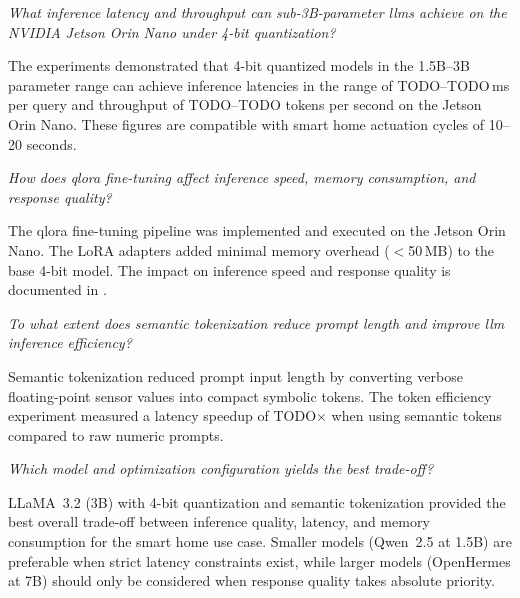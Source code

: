 \documentclass[12pt,a4paper,oneside]{report}
\begin{document}
\begin{description}[style=nextline,leftmargin=1.2cm]
    \item[\textbf{RQ1.}] \textit{What inference latency and throughput can sub-3B-parameter \glspl{llm} achieve on the NVIDIA Jetson Orin Nano under 4-bit quantization?}

    The experiments demonstrated that 4-bit quantized models in the 1.5B--3B parameter range can achieve inference latencies in the range of TODO--TODO\,ms per query and throughput of TODO--TODO tokens per second on the Jetson Orin Nano. These figures are compatible with smart home actuation cycles of 10--20 seconds.

    \item[\textbf{RQ2.}] \textit{How does \gls{qlora} fine-tuning affect inference speed, memory consumption, and response quality?}

    The \gls{qlora} fine-tuning pipeline was implemented and executed on the Jetson Orin Nano. The LoRA adapters added minimal memory overhead ($<$50\,MB) to the base 4-bit model. The impact on inference speed and response quality is documented in .

    \item[\textbf{RQ3.}] \textit{To what extent does semantic tokenization reduce prompt length and improve \gls{llm} inference efficiency?}

    Semantic tokenization reduced prompt input length by converting verbose floating-point sensor values into compact symbolic tokens. The token efficiency experiment measured a latency speedup of TODO$\times$ when using semantic tokens compared to raw numeric prompts.

    \item[\textbf{RQ4.}] \textit{Which model and optimization configuration yields the best trade-off?}

    LLaMA~3.2 (3B) with 4-bit quantization and semantic tokenization provided the best overall trade-off between inference quality, latency, and memory consumption for the smart home use case. Smaller models (Qwen~2.5 at 1.5B) are preferable when strict latency constraints exist, while larger models (OpenHermes at 7B) should only be considered when response quality takes absolute priority.
\end{description}
\end{document}
